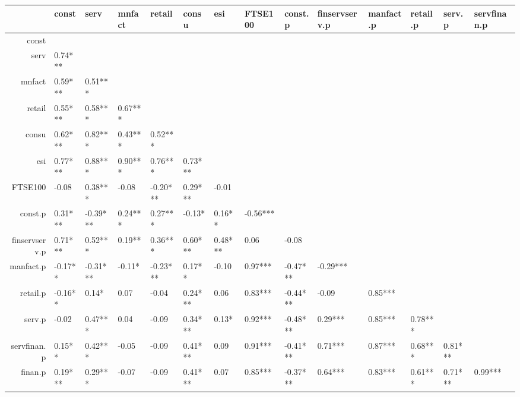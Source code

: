 \documentclass[10pt,a4paper]{report}
\author{Ahmed Salhin}
\begin{document}
	\begin{landscape}
		\begin{table}[ht]
			\centering
			\begin{tabular}{rlllllllllllll}
				\hline
				& const & serv & mnfact & retail & consu & esi & FTSE100 & const.p & finservserv.p & manfact.p & retail.p & serv.p & servfinan.p \\ 
				\hline
				const &  &  &  &  &  &  &  &  &  &  &  &  &  \\ 
				serv &  0.74*** &  &  &  &  &  &  &  &  &  &  &  &  \\ 
				mnfact &  0.59*** &  0.51*** &  &  &  &  &  &  &  &  &  &  &  \\ 
				retail &  0.55*** &  0.58*** &  0.67*** &  &  &  &  &  &  &  &  &  &  \\ 
				consu &  0.62*** &  0.82*** &  0.43*** &  0.52*** &  &  &  &  &  &  &  &  &  \\ 
				esi &  0.77*** &  0.88*** &  0.90*** &  0.76*** &  0.73*** &  &  &  &  &  &  &  &  \\ 
				FTSE100 & -0.08  &  0.38*** & -0.08  & -0.20*** &  0.29*** & -0.01  &  &  &  &  &  &  &  \\ 
				const.p &  0.31*** & -0.39*** &  0.24*** &  0.27*** & -0.13*  &  0.16**  & -0.56*** &  &  &  &  &  &  \\ 
				finservserv.p &  0.71*** &  0.52*** &  0.19**  &  0.36*** &  0.60*** &  0.48*** &  0.06  & -0.08  &  &  &  &  &  \\ 
				manfact.p & -0.17**  & -0.31*** & -0.11*  & -0.23*** &  0.17**  & -0.10  &  0.97*** & -0.47*** & -0.29*** &  &  &  &  \\ 
				retail.p & -0.16**  &  0.14*  &  0.07  & -0.04  &  0.24*** &  0.06  &  0.83*** & -0.44*** & -0.09  &  0.85*** &  &  &  \\ 
				serv.p & -0.02  &  0.47*** &  0.04  & -0.09  &  0.34*** &  0.13*  &  0.92*** & -0.48*** &  0.29*** &  0.85*** &  0.78*** &  &  \\ 
				servfinan.p &  0.15**  &  0.42*** & -0.05  & -0.09  &  0.41*** &  0.09  &  0.91*** & -0.41*** &  0.71*** &  0.87*** &  0.68*** &  0.81*** &  \\ 
				finan.p &  0.19*** &  0.29*** & -0.07  & -0.09  &  0.41*** &  0.07  &  0.85*** & -0.37*** &  0.64*** &  0.83*** &  0.61*** &  0.71*** &  0.99*** \\ 
				\hline
			\end{tabular}
		\end{table}
	\end{landscape}
\end{document}
